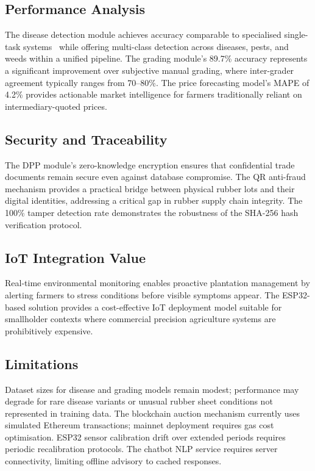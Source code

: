 \documentclass[10pt, conference]{IEEEtran}
\begin{document}
\subsection{Performance Analysis}

The disease detection module achieves accuracy comparable to
specialised single-task systems~\cite{withana2023, wang2022} while
offering multi-class detection across diseases, pests, and weeds
within a unified pipeline. The grading module's 89.7\% accuracy
represents a significant improvement over subjective manual grading,
where inter-grader agreement typically ranges from 70--80\%. The price
forecasting model's MAPE of 4.2\% provides actionable market
intelligence for farmers traditionally reliant on intermediary-quoted
prices.

\subsection{Security and Traceability}

The DPP module's zero-knowledge encryption ensures that confidential
trade documents remain secure even against database compromise. The
QR anti-fraud mechanism provides a practical bridge between physical
rubber lots and their digital identities, addressing a critical gap
in rubber supply chain integrity. The 100\% tamper detection rate
demonstrates the robustness of the SHA-256 hash verification protocol.

\subsection{IoT Integration Value}

Real-time environmental monitoring enables proactive plantation
management by alerting farmers to stress conditions before visible
symptoms appear. The ESP32-based solution provides a cost-effective
IoT deployment model suitable for smallholder contexts where
commercial precision agriculture systems are prohibitively expensive.

\subsection{Limitations}

Dataset sizes for disease and grading models remain modest;
performance may degrade for rare disease variants or unusual rubber
sheet conditions not represented in training data. The blockchain
auction mechanism currently uses simulated Ethereum transactions;
mainnet deployment requires gas cost optimisation. ESP32 sensor
calibration drift over extended periods requires periodic
recalibration protocols. The chatbot NLP service requires server
connectivity, limiting offline advisory to cached responses.
\end{document}
